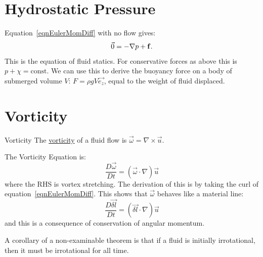 \documentclass[../Main.tex]{subfiles}
\begin{document}
\section{Hydrostatic Pressure}
Equation~\ref{eqnEulerMomDiff} with no flow gives:
\begin{equation*}
    \vec0 = -\nabla p + \mathbf{f}.
\end{equation*}
This is the equation of fluid statics. For conservative forces as above this is $p + \chi = \text{const}$. We can use this to derive the buoyancy force on a body of submerged volume $V$: $F = \rho g V \vec{e_z}$, equal to the weight of fluid displaced.
\section{Vorticity}
\begin{definition}{Vorticity}
    The \underline{vorticity} of a fluid flow is $\vec{\omega} = \nabla \times \vec{u}$.
\end{definition}
The Vorticity Equation is:
\begin{equation*}
    \frac{D \vec{\omega}}{D t} = (\vec{\omega} \cdot \nabla)\vec{u}
\end{equation*}
where the RHS is vortex stretching. The derivation of this is by taking the curl of equation~\ref{eqnEulerMomDiff}. This shows that $\vec{\omega}$ behaves like a material line:
\begin{equation*}
    \frac{D \vec{\delta l}}{D t} = (\vec{\delta l} \cdot \nabla) \vec{u}
\end{equation*}
and this is a consequence of conservation of angular momentum.

A corollary of a non-examinable theorem is that if a fluid is initially irrotational, then it must be irrotational for all time.
\end{document}
